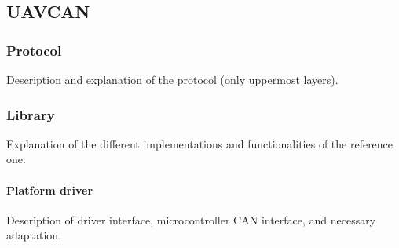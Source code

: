 \subsection{UAVCAN}



\subsubsection{Protocol}
Description and explanation of the protocol (only uppermost layers).

\subsubsection{Library}
Explanation of the different implementations and functionalities of the reference one.

\paragraph{Platform driver}
Description of driver interface, microcontroller CAN interface, and necessary adaptation.
